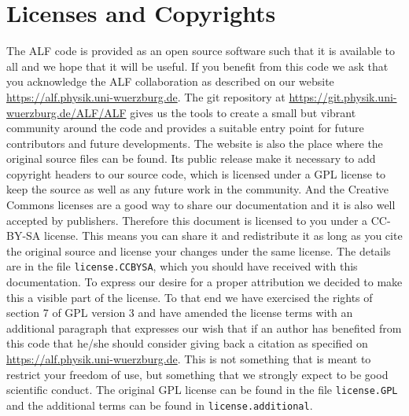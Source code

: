 

\section{Licenses and Copyrights}

The  ALF code  is provided as an open source software  such that it is  available  to all and we  hope that  it 
will be useful.  If you benefit from this code  we ask that you acknowledge  the ALF collaboration as described on our website \url{https://alf.physik.uni-wuerzburg.de}.  The git repository at \url{https://git.physik.uni-wuerzburg.de/ALF/ALF} gives us the tools to create a small but vibrant community around the code and provides a suitable entry point for future contributors  and future developments. 
The website is also the place where the original source files can be found.
Its public release make it necessary to add copyright headers to our source code, which is licensed under a GPL license to keep the source as well as any future work in the community. And the Creative Commons licenses are a good way to share our documentation and it is also well accepted by publishers. Therefore this document is licensed to you under a CC-BY-SA license.
This means you can share it and redistribute it as long as you cite the original source and license your changes under the same license. The details are in the file \texttt{license.CCBYSA}, which you should have received with this documentation.
To express our desire for a proper attribution we decided to make this a visible part of the license.
To that end we have exercised the rights of section 7 of GPL version 3 and have amended the license terms with an additional paragraph that expresses our wish that if an author has benefited from this code
that he/she should consider giving back a citation as specified on \url{https://alf.physik.uni-wuerzburg.de}.
This is not something that is meant to restrict your freedom of use, but something that we strongly expect to be good scientific conduct.
The original GPL license can be found in the file \texttt{license.GPL} and the additional terms can be found in \texttt{license.additional}.
